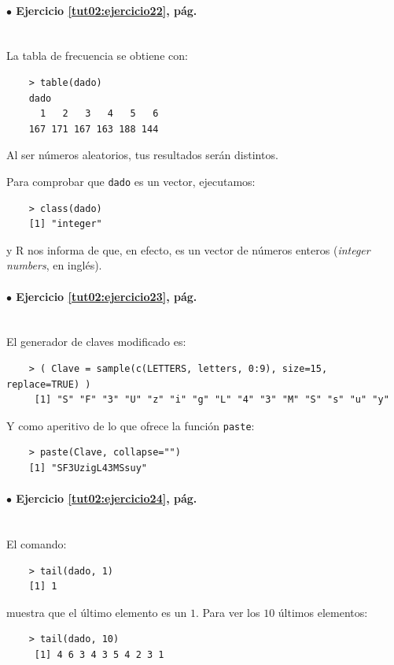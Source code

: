 \documentclass[10pt,a4paper]{article}\usepackage[]{graphicx}\usepackage[]{color}
\begin{document}
\paragraph{\bf $\bullet$ Ejercicio \ref{tut02:ejercicio22},  pág. \pageref{tut02:ejercicio22}}
\label{tut02:ejercicio22:sol}\quad\\

La tabla de frecuencia se obtiene con:
\begin{verbatim}
    > table(dado)
    dado
      1   2   3   4   5   6
    167 171 167 163 188 144
\end{verbatim}
Al ser números aleatorios, tus resultados serán distintos.

Para comprobar que {\tt dado} es un vector, ejecutamos:
\begin{verbatim}
    > class(dado)
    [1] "integer"
\end{verbatim}
y R nos informa de que, en efecto, es un vector de números enteros ({\em integer numbers}, en  inglés).

\paragraph{\bf $\bullet$ Ejercicio \ref{tut02:ejercicio23},  pág. \pageref{tut02:ejercicio23}}
\label{tut02:ejercicio23:sol}\quad\\
El generador de claves modificado es:
\begin{verbatim}
    > ( Clave = sample(c(LETTERS, letters, 0:9), size=15, replace=TRUE) )
     [1] "S" "F" "3" "U" "z" "i" "g" "L" "4" "3" "M" "S" "s" "u" "y"
\end{verbatim}
Y como aperitivo de lo que ofrece la función {\tt paste}:
\begin{verbatim}
    > paste(Clave, collapse="")
    [1] "SF3UzigL43MSsuy"
\end{verbatim}

\paragraph{\bf $\bullet$ Ejercicio \ref{tut02:ejercicio24},  pág. \pageref{tut02:ejercicio24}}
\label{tut02:ejercicio24:sol}\quad\\
El comando:
\begin{verbatim}
    > tail(dado, 1)
    [1] 1
\end{verbatim}
muestra que el último elemento es un $1$. Para ver los $10$ últimos elementos:
\begin{verbatim}
    > tail(dado, 10)
     [1] 4 6 3 4 3 5 4 2 3 1
\end{verbatim}
\end{document}
